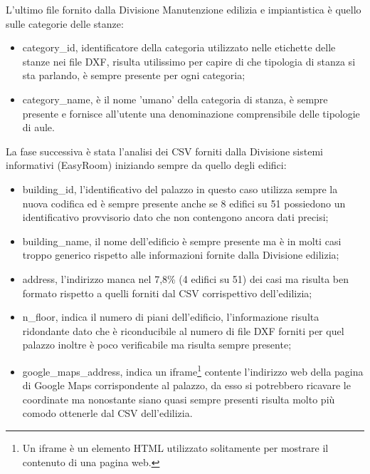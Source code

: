 \documentclass[12pt]{report}
\begin{document}
L'ultimo file fornito dalla Divisione Manutenzione edilizia e impiantistica è quello sulle categorie delle stanze:
\begin{itemize}
\item category\_id, identificatore della categoria utilizzato nelle etichette delle stanze nei file DXF, risulta utilissimo per capire di che tipologia di stanza si sta parlando, è sempre presente per ogni categoria;
\item category\_name, è il nome 'umano'  della categoria di stanza, è sempre presente e fornisce all'utente una denominazione comprensibile delle tipologie di aule.
\end{itemize} 

\newpage

La fase successiva è stata l'analisi dei CSV forniti dalla Divisione sistemi informativi (EasyRoom) iniziando sempre da quello degli edifici:
\begin{itemize}
\item building\_id, l'identificativo del palazzo in questo caso utilizza sempre la nuova codifica ed è sempre presente anche se 8 edifici su 51 possiedono un identificativo provvisorio dato che non contengono ancora dati precisi;
\item building\_name, il nome dell'edificio è sempre presente ma è in molti casi troppo generico rispetto alle informazioni fornite dalla Divisione edilizia;
\item address, l'indirizzo manca nel 7,8\% (4 edifici su 51) dei casi ma risulta ben formato rispetto a quelli forniti dal CSV corrispettivo dell'edilizia;
\item n\_floor, indica il numero di piani dell'edificio, l'informazione risulta ridondante dato che è riconducibile al numero di file DXF forniti per quel palazzo inoltre è poco verificabile ma risulta sempre presente;
\item google\_maps\_address, indica un iframe\footnote{Un iframe è un elemento HTML utilizzato solitamente per mostrare il contenuto di una pagina web.} contente l'indirizzo web della pagina di Google Maps corrispondente al palazzo, da esso si potrebbero ricavare le coordinate ma nonostante siano quasi sempre presenti risulta molto più comodo ottenerle dal CSV dell'edilizia. 
\end{itemize} 

\vspace{5mm} %
\end{document}
